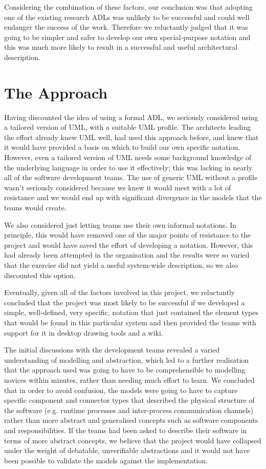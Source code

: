 Considering the combination of these factors, our conclusion was that adopting one of the existing research ADLs was unlikely to be successful and could well endanger the success of the work.  Therefore we reluctantly judged that it was going to be simpler and safer to develop our own special-purpose notation and this was much more likely to result in a successful and useful architectural description.  
  
\section{The Approach}
\label{sec:approach}

  Having discounted the idea of using a formal ADL, we seriously considered using a tailored version of UML, with a suitable UML profile.  The architects leading the effort already knew UML well, had used this approach before, and knew that it would have provided a basis on which to build our own specific notation.  However, even a tailored version of UML needs some background knowledge of the underlying language in order to use it effectively; this was lacking in nearly all of the software development teams.  The use of generic UML without a profile wasn't seriously considered because we knew it would meet with a lot of resistance and we would end up with significant divergence in the models that the teams would create.

  We also considered just letting teams use their own informal notations.  In principle, this would have removed one of the major points of resistance to the project and would have saved the effort of developing a notation.  However, this had already been attempted in the organisation and the results were so varied that the exercise did not yield a useful system-wide description, so we also discounted this option.

  Eventually, given all of the factors involved in this project, we reluctantly concluded that the project was most likely to be successful if we developed a simple, well-defined, very specific, notation that just contained the element types that would be found in this particular system and then provided the teams with support for it in desktop drawing tools and a wiki.

  The initial discussions with the development teams revealed a varied understanding of modelling and abstraction, which led to a further realisation that the approach used was going to have to be comprehensible to modelling novices within minutes, rather than needing much effort to learn.  We concluded that in order to avoid confusion, the models were going to have to capture specific component and connector types that described the physical structure of the software (e.g. runtime processes and inter-process communication channels) rather than more abstract and generalised concepts such as software components and responsibilities.  If the teams had been asked to describe their software in terms of more abstract concepts, we believe that the project would have collapsed under the weight of debatable, unverifiable abstractions and it would not have been possible to validate the models against the implementation.

